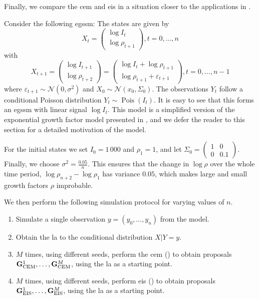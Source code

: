 Finally, we compare the \acrshort{cem} and \acrshort{eis} in a situation closer to the applications in . 
\begin{example}
    \label{ex:growth_factor_ssm_are}
    Consider the following \acrshort{egssm}: The states are given by 
    $$
        X_{t} = \begin{pmatrix}
            \log I_{t}\\
            \log \rho_{t + 1}
        \end{pmatrix}, t = 0, \dots, n
    $$
    with 
    $$
        X_{t + 1} = \begin{pmatrix}
            \log I_{t+1} \\
            \log \rho_{t + 2}
        \end{pmatrix} = \begin{pmatrix}
            \log I_{t} + \log \rho_{t+1} \\
            \log \rho_{t + 1} + \varepsilon_{t + 1}
        \end{pmatrix}, t = 0, \dots, n - 1
    $$
    where $\varepsilon_{t + 1} \sim \mathcal N (0, \sigma^{2})$ and $X_{0} \sim \mathcal N( x_{0}, \Sigma_{0})$. 
    The observations $Y_{t}$ follow a conditional Poisson distribution $Y_{t} \sim \operatorname{Pois} \left( I_{t} \right)$. It is easy to see that this forms an \acrshort{egssm} with linear signal $\log I_{t}$.
    This model is a simplified version of the exponential growth factor model presented in , and we defer the reader to this section for a detailed motivation of the model.

    For the initial states we set $I_{0} = 1\,000$ and $\rho_{1} = 1$, and let $\Sigma_{0} = \begin{pmatrix}
        1 & 0 \\
        0 & 0.1 
    \end{pmatrix}$. Finally, we choose $\sigma^{2} = \frac{0.05}{n}$. This ensures that the change in  $\log \rho$ over the whole time period, $\log \rho_{n + 2} - \log \rho_{1}$ has variance $0.05$, which makes large and small growth factors $\rho$ improbable.

    We then perform the following simulation protocol for varying values of $n$. 
    \begin{enumerate}
        \item Simulate a single observation $y=(y_{0}, \dots, y_{n})$ from the model.
        \item Obtain the \acrshort{la} to the conditional distribution $X|Y = y$.
        \item $M$ times, using different seeds, perform the \acrshort{cem} () to obtain proposals $\mathbf G^{1}_{\text{CEM}}, \dots, \mathbf G^{M}_{\text{CEM}}$, using the \acrshort{la} as a starting point.
        \item $M$ times, using different seeds, perform \acrshort{eis} () to obtain proposals $\mathbf G^{1}_{\text{EIS}}, \dots, \mathbf G^{M}_{\text{EIS}}$, using the \acrshort{la} as a starting point. 
    \end{enumerate}
    

\end{example}
